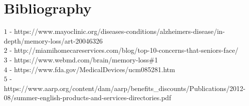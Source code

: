 \documentclass[12pt]{article}
\theoremstyle{plain}
\theoremstyle{definition}
\begin{document}
\section*{Bibliography}
${1}$ - https://www.mayoclinic.org/diseases-conditions/alzheimers-disease/in-depth/memory-loss/art-20046326
\\
${2}$ - http://miamihomecareservices.com/blog/top-10-concerns-that-seniors-face/
\\
${3}$ - https://www.webmd.com/brain/memory-loss\#1
\\
${4}$ - https://www.fda.gov/MedicalDevices/ucm085281.htm
\\
${5}$ - https://www.aarp.org/content/dam/aarp/benefits\_discounts/Publications/2012-08/summer-english-products-and-services-directories.pdf
\end{document}
